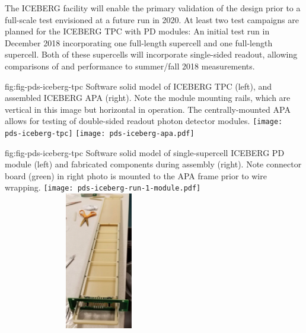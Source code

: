 
The ICEBERG facility will enable the primary validation of the  design prior to a full-scale test envisioned at a future  run in 2020. 
At least two test campaigns are planned for the ICEBERG TPC with PD modules:  An initial test run in December 2018 incorporating one full-length  supercell and one full-length  supercell.  Both of these supercells will incorporate single-sided readout, allowing comparisons of  and  performance to summer/fall 2018  measurements.


 \begin{dunefigure}
 {fig:fig-pds-iceberg-tpc}
 {Software solid model of ICEBERG TPC (left), and assembled ICEBERG APA (right).  Note the  module mounting rails, which are vertical in this image but horizontal in operation. The centrally-mounted APA allows for testing of double-sided readout photon detector modules.}
\texttt{[image: pds-iceberg-tpc]}
\texttt{[image: pds-iceberg-apa.pdf]}
\end{dunefigure}



\begin{dunefigure}
 {fig:fig-pds-iceberg-tpc}
 {Software solid model of single-supercell ICEBERG PD module (left) and fabricated components during assembly (right).  Note connector board (green) in right photo is mounted to the APA frame prior to wire wrapping.}
\texttt{[image: pds-iceberg-run-1-module.pdf]}
\includegraphics[angle=0,width=8.4cm,height=6cm]{graphics/pds-iceberg-module-assembly-photo.pdf}
\end{dunefigure}

